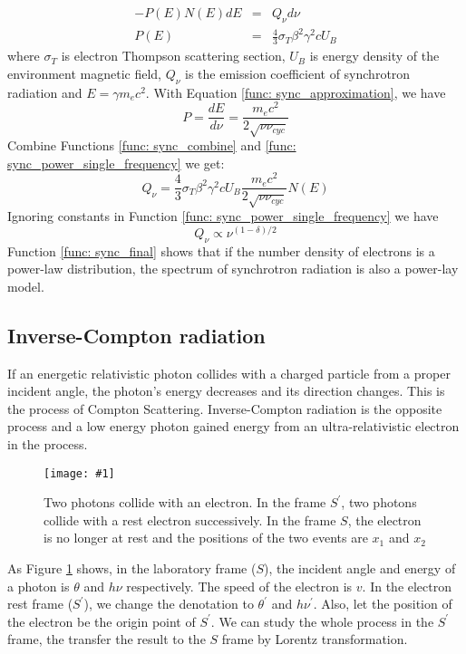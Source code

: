 \documentclass[12pt]{report}
\newcommand{\singleFig}[3]{
  \begin{figure}[!htp]
    \centering
    \texttt{[image: \#1]}
    \caption{#3}
    \label{fig: #1}
  \end{figure}
}
\begin{document}
      \begin{eqnarray}
        \label{func: sync_power_single_frequency}
        -P\left(E\right)N\left(E\right)dE &=& Q_{\nu} d\nu\\
        P\left(E\right) &=& \frac{4}{3} \sigma_{T} \beta^2 \gamma^2 c U_B
      \end{eqnarray} 
      where $\sigma_{T}$ is electron Thompson scattering section, $U_B$ is energy 
      density of the environment magnetic field, $Q_{\nu}$ is the emission coefficient 
      of synchrotron radiation and $E=\gamma m_e c^2$. With Equation 
      \ref{func: sync_approximation}, we have
      \begin{equation}
        \label{func: sync_combine}
        P = \frac{dE}{d\nu} = \frac{m_e c^2}{2\sqrt{\nu \nu_{cyc}}}
      \end{equation}
      Combine Functions \ref{func: sync_combine} and 
      \ref{func: sync_power_single_frequency} we get:
      \begin{equation}
        Q_{\nu} = \frac{4}{3} \sigma_{T} \beta^2 \gamma^2 c U_B \frac{m_e c^2}{2\sqrt{\nu \nu_{cyc}}} N\left(E\right)
      \end{equation}
      Ignoring constants in Function \ref{func: sync_power_single_frequency} we have 
      \begin{equation}
        \label{func: sync_final}
        Q_{\nu} \propto \nu^{(1-\delta)/2}
      \end{equation}
      Function \ref{func: sync_final} shows that if the number density of electrons is 
      a power-law distribution, the spectrum of synchrotron radiation is also a 
      power-lay model.  
            
    \subsection{Inverse-Compton radiation}
      If an energetic relativistic photon collides with a charged particle from a 
      proper incident angle, the photon's energy decreases and its direction changes. 
      This is the process of Compton Scattering. Inverse-Compton radiation is the 
      opposite process and a low energy photon gained energy from an ultra-relativistic 
      electron in the process. 

      \singleFig{inverse_compton}{0.45}{Two photons collide with an 
      electron. In the frame $S^{\prime}$, two photons collide with a rest electron 
      successively. In the frame $S$, the electron is no longer at rest and the 
      positions of the two events are $x_1$ and $x_2$}
      As Figure \ref{fig: inverse_compton} shows, in the laboratory frame ($S$), the 
      incident angle and energy of a photon is $\theta$ and $h \nu$ respectively. 
      The speed of the electron is $v$. In the electron rest frame ($S^{\prime}$), 
      we change the denotation to $\theta^{\prime}$ and $h \nu^{\prime}$. Also, let 
      the position of the electron be the origin point of $S^{\prime}$. We can study 
      the whole process in the $S^{\prime}$ frame, the transfer the result to the $S$ 
      frame by Lorentz transformation. 
\end{document}
